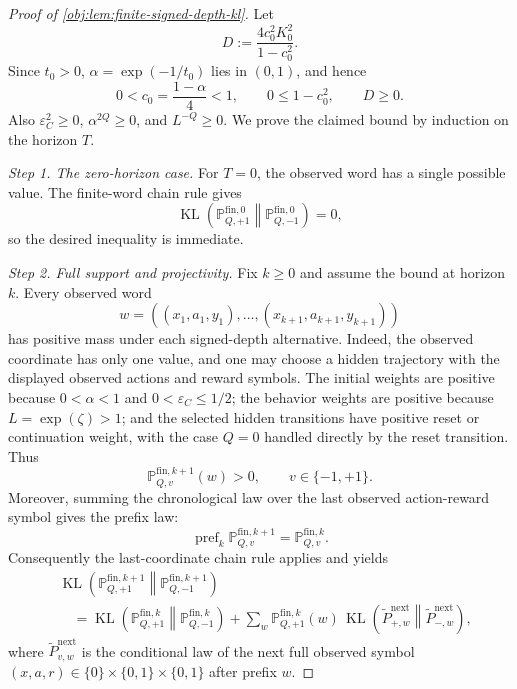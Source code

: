 \begin{proof}[Proof of \cref{obj:lem:finite-signed-depth-kl}]
Let
\[
D:=\frac{4c_0^2K_0^2}{1-c_0^2}.
\]
Since \(t_0>0\), \(\alpha=\exp(-1/t_0)\) lies in \((0,1)\), and hence
\[
0<c_0=\frac{1-\alpha}{4}<1,\qquad 0\le 1-c_0^2,\qquad D\ge 0 .
\]
Also \(\varepsilon_C^2\ge 0\), \(\alpha^{2Q}\ge 0\), and \(L^{-Q}\ge 0\).  We prove the claimed bound by induction on the horizon \(T\). %

\emph{Step 1. The zero-horizon case.}
For \(T=0\), the observed word has a single possible value.  The finite-word chain rule gives
\[
\operatorname{KL}\!\left(\mathbb P_{Q,+1}^{\mathrm{fin},0}\middle\|
\mathbb P_{Q,-1}^{\mathrm{fin},0}\right)=0,
\]
so the desired inequality is immediate. %

\emph{Step 2. Full support and projectivity.}
Fix \(k\ge 0\) and assume the bound at horizon \(k\).  Every observed word
\[
w=((x_1,a_1,y_1),\ldots,(x_{k+1},a_{k+1},y_{k+1}))
\]
has positive mass under each signed-depth alternative.  Indeed, the observed coordinate has only one value, and one may choose a hidden trajectory with the displayed observed actions and reward symbols.  The initial weights are positive because \(0<\alpha<1\) and \(0<\varepsilon_C\le 1/2\); the behavior weights are positive because \(L=\exp(\zeta)>1\); and the selected hidden transitions have positive reset or continuation weight, with the case \(Q=0\) handled directly by the reset transition.  Thus
\[
\mathbb P_{Q,v}^{\mathrm{fin},k+1}(w)>0,
\qquad v\in\{-1,+1\}.
\]
Moreover, summing the chronological law over the last observed action-reward symbol gives the prefix law:
\[
\operatorname{pref}_k\mathbb P_{Q,v}^{\mathrm{fin},k+1}
=
\mathbb P_{Q,v}^{\mathrm{fin},k}.
\]
Consequently the last-coordinate chain rule applies and yields
\[
\begin{aligned}
&\operatorname{KL}\!\left(\mathbb P_{Q,+1}^{\mathrm{fin},k+1}
 \middle\|\mathbb P_{Q,-1}^{\mathrm{fin},k+1}\right)  \\
&\quad =
\operatorname{KL}\!\left(\mathbb P_{Q,+1}^{\mathrm{fin},k}
 \middle\|\mathbb P_{Q,-1}^{\mathrm{fin},k}\right)
+
\sum_{w}
\mathbb P_{Q,+1}^{\mathrm{fin},k}(w)\,
\operatorname{KL}\!\left(\widetilde P_{+,w}^{\mathrm{next}}\middle\|\widetilde P_{-,w}^{\mathrm{next}}\right),
\end{aligned}
\]
where \(\widetilde P_{v,w}^{\mathrm{next}}\) is the conditional law of the next full observed symbol \((x,a,r)\in\{0\}\times\{0,1\}\times\{0,1\}\) after prefix \(w\). %


\end{proof}

